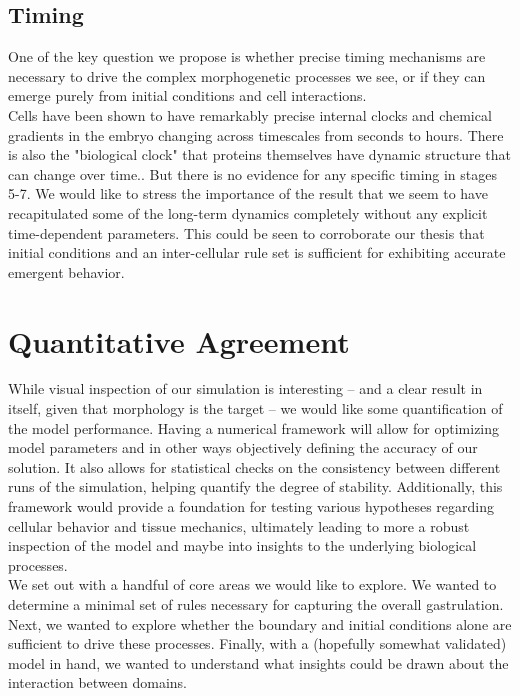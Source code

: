 

\subsection{Timing}
One of the key question we propose is whether precise timing mechanisms are necessary to drive the complex morphogenetic processes we see, or if they can emerge purely from initial conditions and cell interactions.\\
Cells have been shown to have remarkably precise internal clocks and chemical gradients in the embryo changing across timescales from seconds to hours\cite{shvartsman2008dynamics}. There is also the "biological clock"\cite{johanolsen2} that proteins themselves have dynamic structure that can change over time.\cite{johanolsen1}. But there is no evidence for any specific timing in stages 5-7. We would like to stress the importance of the result that we seem to have recapitulated some of the long-term dynamics completely without any explicit time-dependent parameters. This could be seen to corroborate our thesis that initial conditions and an inter-cellular rule set is sufficient for exhibiting accurate emergent behavior.
\newpage
\section{Quantitative Agreement}

While visual inspection of our simulation is interesting -- and a clear result in itself, given that morphology is the target -- we would like some quantification of the model performance. Having a numerical framework will allow for optimizing model parameters and in other ways objectively defining the accuracy of our solution. It also allows for statistical checks on the consistency between different runs of the simulation, helping quantify the degree of stability. Additionally, this framework would provide a foundation for testing various hypotheses regarding cellular behavior and tissue mechanics, ultimately leading to more a robust inspection of the model and maybe into insights to the underlying biological processes.\\


We set out with a handful of core areas we would like to explore. We wanted to determine a minimal set of rules necessary for capturing the overall gastrulation. Next, we wanted to explore whether the boundary and initial conditions alone are sufficient to drive these processes. Finally, with a (hopefully somewhat validated) model in hand, we wanted to understand what insights could be drawn about the interaction between domains.\\


